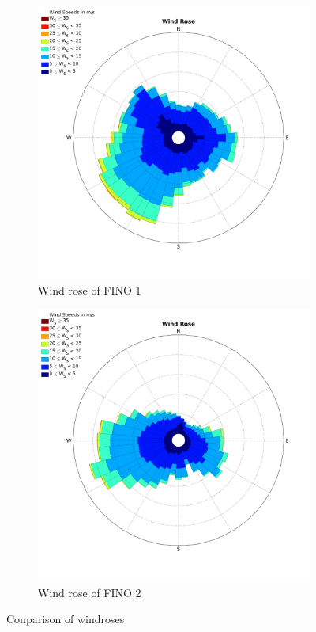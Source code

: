 \documentclass[10pt]{article}
\begin{document}
\begin{figure}[htb!]
\label{fig:WindRose1_valdidation}
\begin{subfigure}{0.5\textwidth}
  \centering
  \includegraphics[width=1\linewidth]{../figures/WindRose_Fino1.png}
  \caption{Wind rose of FINO 1}
\end{subfigure}
\begin{subfigure}{0.5\textwidth}
  \centering
  \includegraphics[width=1\linewidth]{../figures/WindRose_Fino2.png}
  \caption{Wind rose of FINO 2}
\end{subfigure}
\caption{Conparison of windroses}
  \label{fig:Windroses}
\end{figure}
\end{document}
